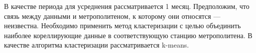 \documentclass[12pt,a4paper,oneside]{extarticle}
\begin{document}

    В качестве периода для усреднения рассматривается 1 месяц. Предположим, что связь между данными и метрополитеном, к которому они относятся --- неизвестна. Необходимо применить метод кластеризации с целью объединить наиболее кореллирующие данные в соответствующую станцию метрополитена. В качестве алгоритма кластеризации рассматривается k-means.
\end{document}
